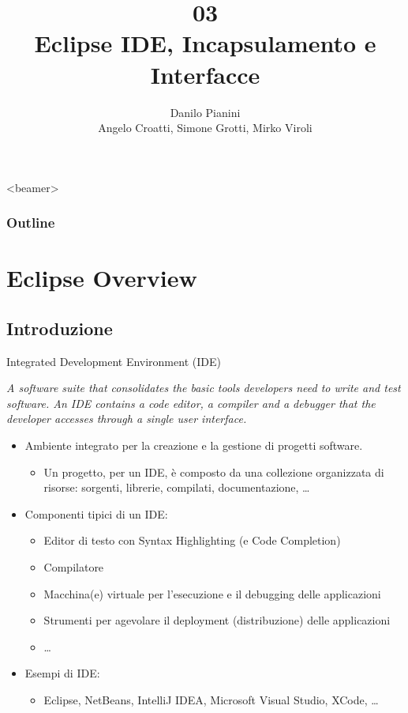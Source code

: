 \documentclass[presentation]{beamer}
\title[OOP03 -- Interfaces]{03\\Eclipse IDE, Incapsulamento e Interfacce}
\author[Pianini]{Danilo Pianini\\Angelo Croatti, Simone Grotti, Mirko Viroli}
\begin{document}
	
\frame[label=coverpage]{\titlepage}


\begin{frame}<beamer>
	\frametitle{Outline}
	\tableofcontents[]
\end{frame}

\section{Eclipse Overview}
\subsection{Introduzione}

\begin{frame}{Integrated Development Environment (IDE)}

\begin{block}{}
\emph{A software suite that consolidates the basic tools developers need to write and test software. An IDE contains a code editor, a compiler and a debugger that the developer accesses through a single user interface.}
\end{block}

\begin{itemize}
\item Ambiente integrato per la creazione e la gestione di progetti software.
\begin{itemize}
\item Un progetto, per un IDE, è composto da una collezione organizzata di risorse: sorgenti, librerie, compilati, documentazione, \dots
\end{itemize}
\item Componenti tipici di un IDE:
\begin{itemize}
\item Editor di testo con Syntax Highlighting (e Code Completion)
\item Compilatore
\item Macchina(e) virtuale per l'esecuzione e il debugging delle applicazioni
\item Strumenti per agevolare il deployment (distribuzione) delle applicazioni
\item \dots
\end{itemize}
\item Esempi di IDE:
\begin{itemize}
\item Eclipse, NetBeans, IntelliJ IDEA, Microsoft Visual Studio, XCode, \dots
\end{itemize}
\end{itemize}
\end{frame}
\end{document}
